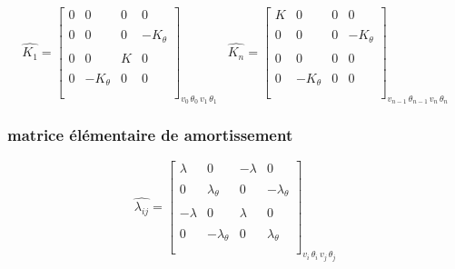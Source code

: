 \documentclass[a4paper,10pt]{report} %
\begin{document}
 \[ \widehat{K_1}=\left[ \begin{array}{cccc}
0 &0& 0&0     \\\\
0&0&0&-K_{\theta} \\\\
0&0& K&0    \\\\
0&-K_{\theta}&0&0   \\\\
 \end{array} \right]_{v_0 \, \theta_0 \, v_1 \, \theta_1 \, }
 \,\,\,\,
 \widehat{K_n}=\left[ \begin{array}{cccc}
K &0& 0&0     \\\\
0&0&0&-K_{\theta} \\\\
0&0& 0&0    \\\\
0&-K_{\theta}&0&0   \\\\
 \end{array} \right]_{v_{n-1} \, \theta_{n-1} \, v_{n} \, \theta_{n} \, }\]

\subsubsection{matrice élémentaire de amortissement}
\[ \widehat{\lambda_{ij}}=\left[ \begin{array}{cccc}
\lambda &0& -\lambda&0     \\\\
0& \lambda_{\theta}&0&-\lambda_{\theta} \\\\
-\lambda &0& \lambda&0    \\\\
0&-\lambda_{\theta}&0&\lambda_{\theta}    \\\\
 \end{array} \right]_{v_i \, \theta_i \, v_j \, \theta_j \, }\]
\end{document}
